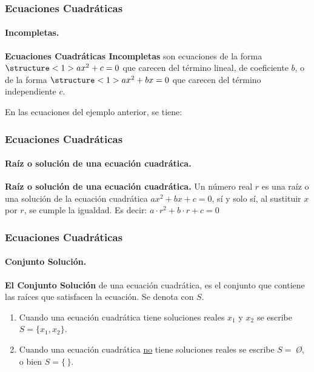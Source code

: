 \documentclass[mathserif]{beamer}
\begin{document}
\begin{frame} 
\frametitle{\bf Ecuaciones Cuadráticas} 
\framesubtitle{Incompletas.} 

\vspace{-0.75mm}
\begin{definicion}[II]
{\bf Ecuaciones Cuadráticas Incompletas} son ecuaciones de la forma $\structure<1>{ax^2+c=0}$ que carecen del término lineal, de coeficiente $b$, o de la forma $\structure<1>{ax^2+bx=0}$ que carecen del término independiente $c$.
\end{definicion}

\pause
En las ecuaciones del ejemplo anterior, se tiene: \vp
\pause
{}
\end{frame}

\begin{frame} 
\frametitle{\bf Ecuaciones Cuadráticas} 
\framesubtitle{Raíz o solución de una ecuación cuadrática.} 

\begin{definicion}[III]
{\bf Raíz o solución de una ecuación cuadrática.} Un número real $r$ es una raíz o una solución de la ecuación cuadrática $ax^2+bx+c=0$, sí y
solo sí, al sustituir $x$ por $r$, se cumple la igualdad. Es decir: $a\cdot r^2+b\cdot r+c=0$
\end{definicion}
\end{frame}

\begin{frame} 
\frametitle{Ecuaciones Cuadráticas} 
\framesubtitle{Conjunto Solución.} 

\begin{definicion}[IV]
{\bf El Conjunto Solución} de una ecuación cuadrática, es el conjunto que contiene las raíces que satisfacen la ecuación. Se denota con $S$. 
\end{definicion}

\pause
\begin{enumerate} 
\item<2-| alert@2> Cuando una ecuación cuadrática tiene soluciones reales $x_1$ y $x_2$ se escribe $S=\{x_1,x_2\}$. 
\item<3-| alert@3>Cuando una ecuación cuadrática \underline{no} tiene soluciones reales se escribe $S=$\,\textit\O,\,\, o bien $S=\{\,\}$.
\pause
\end{enumerate}
\end{frame}
\end{document}
